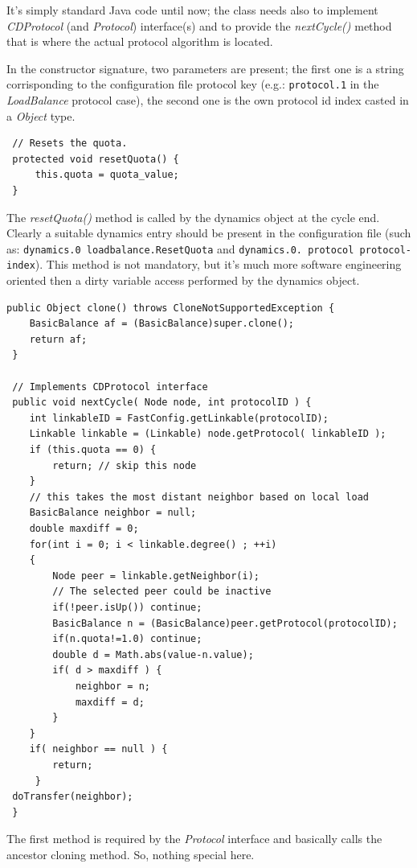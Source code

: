 \documentclass[a4paper,11pt]{article}
\begin{document}
It's simply standard Java code until now; the class needs also to implement
\emph{CDProtocol} (and \emph{Protocol})  interface(s) and to provide 
the \emph{nextCycle()} method 
that is where the actual protocol algorithm is located.

In the constructor signature, two parameters are present; the first
one is a string corrisponding to the configuration file protocol key
(e.g.: \texttt{protocol.1} in the \emph{LoadBalance} protocol case), the second
one is the own protocol id index casted in a \emph{Object} type.

\footnotesize
\begin{verbatim}
 // Resets the quota. 
 protected void resetQuota() {
     this.quota = quota_value;
 }
\end{verbatim}
\normalsize

The \emph{resetQuota()} method is called by the dynamics object at
the cycle end. Clearly a suitable dynamics entry should be present
in the configuration file (such as: \texttt{dynamics.0 loadbalance.ResetQuota}
and \texttt{dynamics.0. protocol protocol-index}). This method is not
mandatory, but it's much more software engineering oriented then a
dirty variable access performed by the dynamics object.\\

\footnotesize
\begin{verbatim}
public Object clone() throws CloneNotSupportedException {
 	BasicBalance af = (BasicBalance)super.clone();
 	return af;
 }
 
 // Implements CDProtocol interface
 public void nextCycle( Node node, int protocolID ) {
 	int linkableID = FastConfig.getLinkable(protocolID);
 	Linkable linkable = (Linkable) node.getProtocol( linkableID );
	if (this.quota == 0) {
 		return; // skip this node
 	} 
 	// this takes the most distant neighbor based on local load
 	BasicBalance neighbor = null;
 	double maxdiff = 0;
 	for(int i = 0; i < linkable.degree() ; ++i)
 	{
 		Node peer = linkable.getNeighbor(i);
 		// The selected peer could be inactive
 		if(!peer.isUp()) continue; 
 		BasicBalance n = (BasicBalance)peer.getProtocol(protocolID);
 		if(n.quota!=1.0) continue;
 		double d = Math.abs(value-n.value);
 		if( d > maxdiff ) {
			neighbor = n;
			maxdiff = d;
		}
	}
 	if( neighbor == null ) {
 		return;
	 }
 doTransfer(neighbor);
 }
\end{verbatim}
\normalsize


The first method is required by the \emph{Protocol} interface and basically
calls the ancestor cloning method. So, nothing special here.
\end{document}
